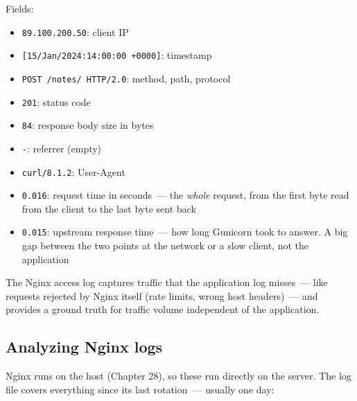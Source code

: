 \noindent{}Fields:

\begin{itemize}
\tightlist
\item
  \texttt{89.100.200.50}: client IP
\item
  \texttt{{[}15/}\allowbreak{}\texttt{Jan/}\allowbreak{}\texttt{2024:}\allowbreak{}\texttt{14:}\allowbreak{}\texttt{00:}\allowbreak{}\texttt{00\ +0000{]}}: timestamp
\item
  \texttt{POST\ /}\allowbreak{}\texttt{notes/}\allowbreak{}\texttt{\ HTTP/}\allowbreak{}\texttt{2.0}: method, path, protocol
\item
  \texttt{201}: status code
\item
  \texttt{84}: response body size in bytes
\item
  \texttt{-}: referrer (empty)
\item
  \texttt{curl/8.1.2}: User-Agent
\item
  \texttt{0.016}: request time in seconds~--- the \emph{whole} request, from the first byte read from the client to the last byte sent back
\item
  \texttt{0.015}: upstream response time~--- how long Gunicorn took to answer. A big gap between the two points at the network or a slow client, not the application
\end{itemize}

\noindent{}The Nginx access log captures traffic that the application log misses~--- like requests rejected by Nginx itself (rate limits, wrong host headers)~--- and provides a ground truth for traffic volume independent of the application.

\subsection*{Analyzing Nginx logs}\label{35-observability:analyzing-nginx-logs}

Nginx runs on the host (Chapter 28), so these run directly on the server. The log file covers everything since its last rotation~--- usually one day:

